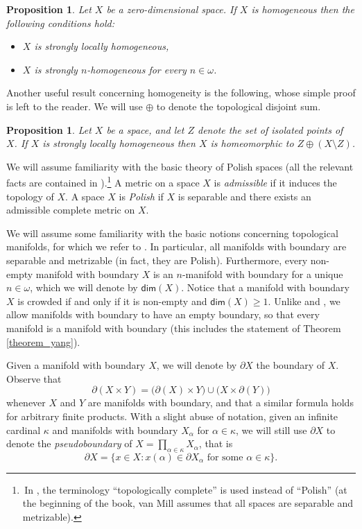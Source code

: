 \documentclass{amsart}
\theoremstyle{plain}
\newtheorem{proposition}[theorem]{Proposition}
\theoremstyle{definition}
\newcommand{\dime}{\mathsf{dim}}
\begin{document}
\begin{proposition}\label{proposition_zero_dimensional}
Let $X$ be a zero-dimensional space. If $X$ is homogeneous then the following conditions hold:
\begin{itemize}
\item $X$ is strongly locally homogeneous,
\item $X$ is strongly $n$-homogeneous for every $n\in\omega$.	
\end{itemize}
\end{proposition}

Another useful result concerning homogeneity is the following, whose simple proof is left to the reader. We will use $\oplus$ to denote the topological disjoint sum.

\begin{proposition}\label{proposition_slh}
Let $X$ be a space, and let $Z$ denote the set of isolated points of~$X$. If $X$ is strongly locally homogeneous then $X$ is homeomorphic to $Z\oplus (X\setminus Z)$.
\end{proposition}

We will assume familiarity with the basic theory of Polish spaces (all the relevant facts are contained in \cite[Appendix A.6]{van_mill_book}).\footnote{\,In \cite{van_mill_book}, the terminology ``topologically complete'' is used instead of ``Polish'' (at the beginning of the book, van Mill assumes that all spaces are separable and metrizable).} A metric on a space $X$ is \emph{admissible} if it induces the topology of $X$. A space $X$ is \emph{Polish} if $X$ is separable and there exists an admissible complete metric on $X$.

We will assume some familiarity with the basic notions concerning topological manifolds, for which we refer to \cite{lee}. In particular, all manifolds with boundary are separable and metrizable (in fact, they are Polish). Furthermore, every non-empty manifold with boundary $X$ is an $n$-manifold with boundary for a unique $n\in\omega$, which we will denote by $\dime(X)$. Notice that a manifold with boundary $X$ is crowded if and only if it is non-empty and $\dime(X)\geq 1$. Unlike \cite{fort} and \cite{yang}, we allow manifolds with boundary to have an empty boundary, so that every manifold is a manifold with boundary (this includes the statement of Theorem \ref{theorem_yang}).

Given a manifold with boundary $X$, we will denote by $\partial X$ the boundary of $X$. Observe that
$$
\partial (X\times Y)=\big(\partial (X)\times Y\big)\cup\big(X\times\partial (Y)\big)
$$
whenever $X$ and $Y$ are manifolds with boundary, and that a similar formula holds for arbitrary finite products. With a slight abuse of notation, given an infinite cardinal $\kappa$ and manifolds with boundary $X_\alpha$ for $\alpha\in\kappa$, we will still use $\partial X$ to denote the \emph{pseudoboundary} of $X=\prod_{\alpha\in\kappa}X_\alpha$, that is
$$
\partial X=\{x\in X:x(\alpha)\in\partial X_\alpha\text{ for some }\alpha\in\kappa\}.
$$
\end{document}
